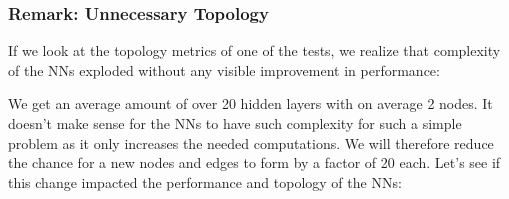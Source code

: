 \documentclass[11pt]{report}
\begin{document}
\begin{enumerate}
    \subsubsection{Remark: Unnecessary Topology}
    If we look at the topology metrics of one of the tests, we realize that complexity of the NNs exploded without any visible improvement in performance:
    \begin{center}
    \end{center}
    We get an average amount of over 20 hidden layers with on average 2 nodes.
    It doesn't make sense for the NNs to have such complexity for such a simple problem as it only increases the needed computations.
    We will therefore reduce the chance for a new nodes and edges to form by a factor of 20 each.
    Let's see if this change impacted the performance and topology of the NNs:
    \\
    \begin{figure}[H]


\end{figure}
\end{enumerate}
\end{document}
